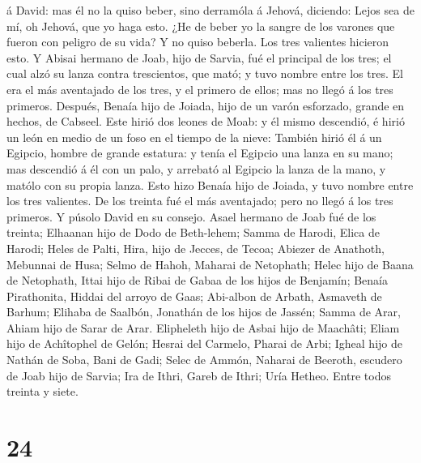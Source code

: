 á David: mas él no la quiso beber, sino derramóla á Jehová, diciendo:
 Lejos sea de mí, oh Jehová, que yo haga esto. ¿He de
beber yo la sangre de los varones que fueron con peligro de su vida? Y
no quiso beberla. Los tres valientes hicieron esto.  Y
Abisai hermano de Joab, hijo de Sarvia, fué el principal de los tres; el
cual alzó su lanza contra trescientos, que mató; y tuvo nombre entre los
tres.  El era el más aventajado de los tres, y el primero
de ellos; mas no llegó á los tres primeros.  Después,
Benaía hijo de Joiada, hijo de un varón esforzado, grande en hechos, de
Cabseel. Este hirió dos leones de Moab: y él mismo descendió, é hirió un
león en medio de un foso en el tiempo de la nieve: 
También hirió él á un Egipcio, hombre de grande estatura: y tenía el
Egipcio una lanza en su mano; mas descendió á él con un palo, y arrebató
al Egipcio la lanza de la mano, y matólo con su propia lanza.
 Esto hizo Benaía hijo de Joiada, y tuvo nombre entre los
tres valientes.  De los treinta fué el más aventajado;
pero no llegó á los tres primeros. Y púsolo David en su consejo.
 Asael hermano de Joab fué de los treinta; Elhaanan hijo
de Dodo de Beth-lehem;  Samma de Harodi, Elica de Harodi;
 Heles de Palti, Hira, hijo de Jecces, de Tecoa;
 Abiezer de Anathoth, Mebunnai de Husa; 
Selmo de Hahoh, Maharai de Netophath;  Helec hijo de
Baana de Netophath, Ittai hijo de Ribai de Gabaa de los hijos de
Benjamín;  Benaía Pirathonita, Hiddai del arroyo de Gaas;
 Abi-albon de Arbath, Asmaveth de Barhum; 
Elihaba de Saalbón, Jonathán de los hijos de Jassén; 
Samma de Arar, Ahiam hijo de Sarar de Arar.  Elipheleth
hijo de Asbai hijo de Maachâti; Eliam hijo de Achîtophel de Gelón;
 Hesrai del Carmelo, Pharai de Arbi; 
Igheal hijo de Nathán de Soba, Bani de Gadi;  Selec de
Ammón, Naharai de Beeroth, escudero de Joab hijo de Sarvia;
 Ira de Ithri, Gareb de Ithri;  Uría
Hetheo. Entre todos treinta y siete.

\hypertarget{section-23}{%
\section{24}\label{section-23}}

